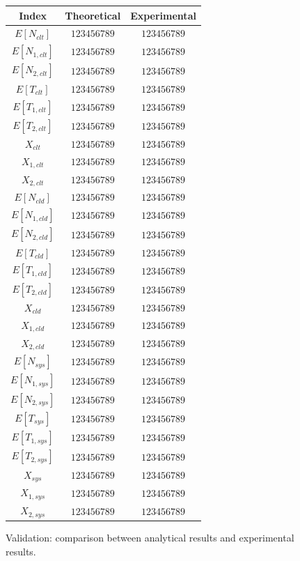 \begin{figure}
	\begin{center}
		\begin{tabular}{|c||c|c|}
			\hline
			Index & Theoretical & Experimental\\
			\hline
			$E[N_{clt}]$  & $123456789$ & $123456789$ \\
			$E[N_{1,clt}]$  & $123456789$ & $123456789$ \\
			$E[N_{2,clt}]$  & $123456789$ & $123456789$ \\
			$E[T_{clt}]$  & $123456789$ & $123456789$ \\
			$E[T_{1,clt}]$  & $123456789$ & $123456789$ \\
			$E[T_{2,clt}]$  & $123456789$ & $123456789$ \\
			$X_{clt}$  & $123456789$ & $123456789$ \\
			$X_{1,clt}$  & $123456789$ & $123456789$ \\
			$X_{2,clt}$  & $123456789$ & $123456789$ \\
			\hline
			$E[N_{cld}]$  & $123456789$ & $123456789$ \\
			$E[N_{1,cld}]$  & $123456789$ & $123456789$ \\
			$E[N_{2,cld}]$  & $123456789$ & $123456789$ \\
			$E[T_{cld}]$  & $123456789$ & $123456789$ \\
			$E[T_{1,cld}]$  & $123456789$ & $123456789$ \\
			$E[T_{2,cld}]$  & $123456789$ & $123456789$ \\
			$X_{cld}$  & $123456789$ & $123456789$ \\
			$X_{1,cld}$  & $123456789$ & $123456789$ \\
			$X_{2,cld}$  & $123456789$ & $123456789$ \\
			\hline
			$E[N_{sys}]$  & $123456789$ & $123456789$ \\
			$E[N_{1,sys}]$  & $123456789$ & $123456789$ \\
			$E[N_{2,sys}]$  & $123456789$ & $123456789$ \\
			$E[T_{sys}]$  & $123456789$ & $123456789$ \\
			$E[T_{1,sys}]$  & $123456789$ & $123456789$ \\
			$E[T_{2,sys}]$  & $123456789$ & $123456789$ \\
			$X_{sys}$  & $123456789$ & $123456789$ \\
			$X_{1,sys}$  & $123456789$ & $123456789$ \\
			$X_{2,sys}$  & $123456789$ & $123456789$ \\
			\hline
		\end{tabular}
	\end{center}
	\caption{Validation: comparison between analytical results and experimental results.}
	\label{tbl:validation}
\end{figure}